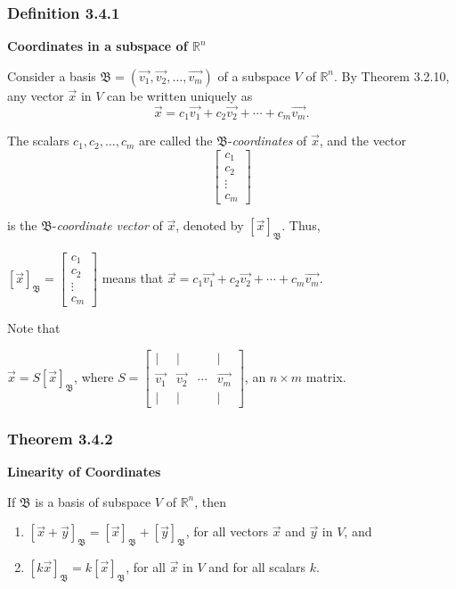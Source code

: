 \documentclass{report}
\begin{document}
\subsubsection*{Definition 3.4.1}
\par\noindent\textbf{Coordinates in a subspace of $\mathbb{R}^{n}$}
\par\noindent Consider a basis $\mathfrak{B}=(\vec{v_{1}},\vec{v_{2}},\ldots{},\vec{v_{m}})$ of a subspace $V$ of $\mathbb{R}^n$. By Theorem 3.2.10, any vector $\vec{x}$ in $V$ can be written uniquely as
\[\vec{x}=c_{1}\vec{v_{1}}+c_{2}\vec{v_{2}}+\cdots{}+c_{m}\vec{v_{m}}.\]
\par\noindent The scalars $c_{1},c_{2},\ldots{},c_{m}$ are called the $\mathfrak{B}$-\textit{coordinates} of $\vec{x}$, and the vector
\[\left[\begin{array}{c}c_{1}\\ c_{2}\\ \vdots{}\\ c_{m}\end{array}\right]\]
\par\noindent is the $\mathfrak{B}$-\textit{coordinate vector} of $\vec{x}$, denoted by $[\vec{x}]_{\mathfrak{B}}$. Thus,
\par\noindent\begin{center} $\displaystyle[\vec{x}]_{\mathfrak{B}}=\left[\begin{array}{c}c_{1}\\ c_{2}\\ \vdots{}\\ c_{m}\end{array}\right]$ means that $\vec{x}=c_{1}\vec{v_{1}}+c_{2}\vec{v_{2}}+\cdots{}+c_{m}\vec{v_{m}}$.\end{center}
\par\noindent Note that
\par\noindent\begin{center} $\displaystyle\vec{x}=S[\vec{x}]_{\mathfrak{B}}$, where $\displaystyle S=\left[\begin{array}{cccc}|&|& &|\\ \vec{v_{1}}&\vec{v_{2}}&\cdots{}&\vec{v_{m}}\\ |&|& &|\end{array}\right]$, an $n\times{}m$ matrix.\end{center}
\subsubsection*{Theorem 3.4.2}
\par\noindent\textbf{Linearity of Coordinates}
\par\noindent If $\mathfrak{B}$ is a basis of subspace $V$ of $\mathbb{R}^{n}$, then
\renewcommand{\labelenumi}{\textbf{\alph{enumi}.}}
\begin{enumerate}
\item $\displaystyle [\vec{x}+\vec{y}]_{\mathfrak{B}}=[\vec{x}]_{\mathfrak{B}}+[\vec{y}]_{\mathfrak{B}}$, for all vectors $\vec{x}$ and $\vec{y}$ in $V$, and
\item $\displaystyle [k\vec{x}]_{\mathfrak{B}}=k[\vec{x}]_{\mathfrak{B}}$, for all $\vec{x}$ in $V$ and for all scalars $k$.
\end{enumerate}
\end{document}
